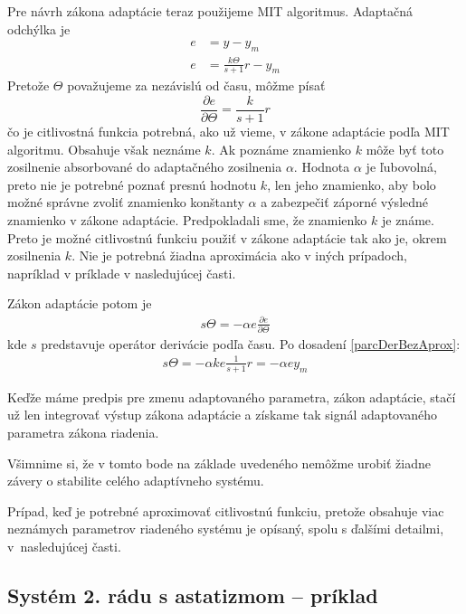 \documentclass[a4paper, 10pt, ]{article}
\begin{document}
Pre návrh zákona adaptácie teraz použijeme MIT algoritmus. Adaptačná odchýlka je
\begin{subequations}
	\begin{align}
		e &= y - y_m \\
		e &= \frac{k \Theta}{s + 1} r - y_m
	\end{align}
\end{subequations}
Pretože $\Theta$ považujeme za nezávislú od času, môžme písať
\begin{equation} \label{parcDerBezAprox}
	\frac{\partial e}{\partial \Theta}
	=
	\frac{k}{s + 1} r
\end{equation}
čo je citlivostná funkcia potrebná, ako už vieme, v zákone adaptácie podľa MIT algoritmu. Obsahuje však neznáme $k$. Ak poznáme znamienko $k$ môže byť toto zosilnenie absorbované do adaptačného zosilnenia $\alpha$. Hodnota $\alpha$ je ľubovolná, preto nie je potrebné poznať presnú hodnotu $k$, len jeho znamienko, aby bolo možné správne zvoliť znamienko konštanty $\alpha$ a zabezpečiť záporné výsledné znamienko v zákone adaptácie. Predpokladali sme, že znamienko $k$ je známe. Preto je možné citlivostnú funkciu použiť v zákone adaptácie tak ako je, okrem zosilnenia $k$. Nie je potrebná žiadna aproximácia ako v iných prípadoch, napríklad v príklade v nasledujúcej časti.

Zákon adaptácie potom je
\begin{align}
	 	s \Theta =  - \alpha e \frac{\partial e}{\partial \Theta}
\end{align}
kde $s$ predstavuje operátor derivácie podľa času. Po dosadení \eqref{parcDerBezAprox}:
\begin{align}
 	s \Theta =  - \alpha k e \frac{1}{s + 1} r = - \alpha  e y_m
\end{align}

Keďže máme predpis pre zmenu adaptovaného parametra, zákon adaptácie, stačí už len integrovať výstup zákona adaptácie a získame tak signál adaptovaného parametra zákona riadenia.

Všimnime si, že v tomto bode na základe uvedeného nemôžme urobiť žiadne závery o stabilite celého adaptívneho systému.

Prípad, keď je potrebné aproximovať citlivostnú funkciu, pretože obsahuje viac neznámych parametrov riadeného systému je opísaný, spolu s ďalšími detailmi, v~nasledujúcej časti.







\subsection{Systém 2. rádu s astatizmom -- príklad}
\label{Systém 2. rádu s astatizmom -- príklad}
\end{document}
